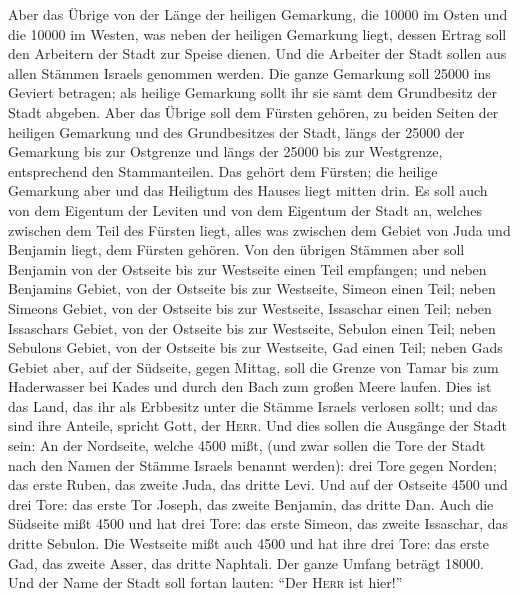  Aber das Übrige von der Länge der heiligen Gemarkung,
die 10000 im Osten und die 10000 im Westen, was neben der heiligen
Gemarkung liegt, dessen Ertrag soll den Arbeitern der Stadt zur Speise
dienen.  Und die Arbeiter der Stadt sollen aus allen
Stämmen Israels genommen werden.  Die ganze Gemarkung
soll 25000 ins Geviert betragen; als heilige Gemarkung sollt ihr sie
samt dem Grundbesitz der Stadt abgeben.  Aber das Übrige
soll dem Fürsten gehören, zu beiden Seiten der heiligen Gemarkung und
des Grundbesitzes der Stadt, längs der 25000 der Gemarkung bis zur
Ostgrenze und längs der 25000 bis zur Westgrenze, entsprechend den
Stammanteilen. Das gehört dem Fürsten; die heilige Gemarkung aber und
das Heiligtum des Hauses liegt mitten drin.  Es soll auch
von dem Eigentum der Leviten und von dem Eigentum der Stadt an, welches
zwischen dem Teil des Fürsten liegt, alles was zwischen dem Gebiet von
Juda und Benjamin liegt, dem Fürsten gehören.  Von den
übrigen Stämmen aber soll Benjamin von der Ostseite bis zur Westseite
einen Teil empfangen;  und neben Benjamins Gebiet, von
der Ostseite bis zur Westseite, Simeon einen Teil;  neben
Simeons Gebiet, von der Ostseite bis zur Westseite, Issaschar einen
Teil;  neben Issaschars Gebiet, von der Ostseite bis zur
Westseite, Sebulon einen Teil;  neben Sebulons Gebiet,
von der Ostseite bis zur Westseite, Gad einen Teil; 
neben Gads Gebiet aber, auf der Südseite, gegen Mittag, soll die Grenze
von Tamar bis zum Haderwasser bei Kades und durch den Bach zum großen
Meere laufen.  Dies ist das Land, das ihr als Erbbesitz
unter die Stämme Israels verlosen sollt; und das sind ihre Anteile,
spricht Gott, der \textsc{Herr}.  Und dies sollen die
Ausgänge der Stadt sein: An der Nordseite, welche 4500 mißt,
 (und zwar sollen die Tore der Stadt nach den Namen der
Stämme Israels benannt werden): drei Tore gegen Norden; das erste Ruben,
das zweite Juda, das dritte Levi.  Und auf der Ostseite
4500 und drei Tore: das erste Tor Joseph, das zweite Benjamin, das
dritte Dan.  Auch die Südseite mißt 4500 und hat drei
Tore: das erste Simeon, das zweite Issaschar, das dritte Sebulon.
 Die Westseite mißt auch 4500 und hat ihre drei Tore: das
erste Gad, das zweite Asser, das dritte Naphtali.  Der
ganze Umfang beträgt 18000. Und der Name der Stadt soll fortan lauten:
``Der \textsc{Herr} ist hier!''

